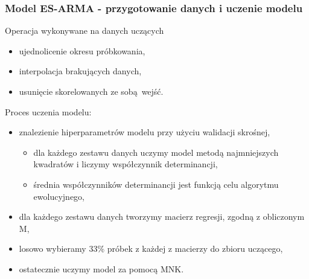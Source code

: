 \documentclass{beamer}
\begin{document}
\begin{frame}
  \frametitle{Model ES-ARMA - przygotowanie danych i uczenie modelu}
  \begin{block}{Operacja wykonywane na danych uczących}
    \begin{itemize}
      \item ujednolicenie okresu próbkowania,
      \item interpolacja brakujących danych,
      \item usunięcie skorelowanych ze sobą wejść.
    \end{itemize}
  \end{block}

  \begin{block}{Proces uczenia modelu:}
    \begin{itemize}
      \item znalezienie hiperparametrów modelu przy użyciu walidacji skrośnej,
      \begin{itemize}
        \item dla każdego zestawu danych uczymy model metodą najmniejszych kwadratów i liczymy współczynnik determinancji,
        \item średnia współczynników determinancji jest funkcją celu algorytmu ewolucyjnego,
      \end{itemize}
      \item dla każdego zestawu danych tworzymy macierz regresji, zgodną z obliczonym M,
      \item losowo wybieramy 33\% próbek z każdej z macierzy do zbioru uczącego,
      \item ostatecznie uczymy model za pomocą MNK.
    \end{itemize}
  \end{block}
\end{frame}
\end{document}

